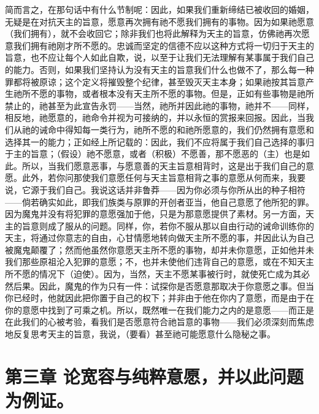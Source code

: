 简而言之，在那句话中有什么节制呢：因此，如果我们重新缔结已被收回的婚姻，无疑是在对抗天主的旨意，愿意再次拥有祂不愿我们拥有的事物。因为如果祂愿意（我们拥有），就不会收回它；除非我们也将此解释为天主的旨意，仿佛祂再次愿意我们拥有祂刚才所不愿的。忠诚而坚定的信德不应以这种方式将一切归于天主的旨意，也不应让每个人如此自欺，说，以至于让我们无法理解有某事属于我们自己的能力。否则，如果我们坚持认为没有天主的旨意我们什么也做不了，那么每一种罪都将被原谅；这个定义将摧毁整个纪律，甚至毁灭天主本身；如果祂按其旨意产生祂所不愿的事物，或者根本没有天主所不愿的事物。但是，正如有些事物是祂所禁止的，祂甚至为此宣告永罚——当然，祂所并因此祂的事物，祂并不——同样，相反地，祂愿意的，祂命令并视为可接纳的，并以永恒的赏报来回报。因此，当我们从祂的诫命中得知每一类行为，祂所不愿的和祂所愿意的，我们仍然拥有意愿和选择其一的能力；正如经上所记载的：因此，我们不应将属于我们自己选择的事归于主的旨意；（假设）祂不愿意，或者（积极）不愿善，那不愿恶的（主）也是如此。所以，当我们愿意恶事，与愿意善的天主旨意相背时，这是出于我们自己的意愿。此外，若你问那使我们意愿任何与天主旨意相背之事的意愿从何而来，我要说，它源于我们自己。我说这话并非鲁莽——因为你必须与你所从出的种子相符——倘若确实如此，即我们族类与原罪的开创者亚当，他自己意愿了他所犯的罪。因为魔鬼并没有将犯罪的意愿强加于他，只是为那意愿提供了素材。另一方面，天主的旨意则成了服从的问题。同样，你，若你不服从那以自由行动的诫命训练你的天主，将通过你意志的自由，心甘情愿地转向做天主所不愿的事，并因此认为自己被魔鬼颠覆了；然而他虽然你意愿天主所不愿的事物，却并未你意愿，正如他并未我们那些原祖沦入犯罪的意愿；不，也并未使他们违背自己的意愿，或在不知天主所不愿的情况下（迫使）。因为，当然，天主不愿某事被行时，就使死亡成为其必然后果。因此，魔鬼的作为只有一件：试探你是否愿意那取决于你意愿之事。但当你已经时，他就因此把你置于自己的权下；并非由于他在你内了意愿，而是由于在你的意愿中找到了可乘之机。所以，既然唯一在我们能力之内的是意愿——而正是在此我们的心被考验，看我们是否愿意符合祂旨意的事物——我们必须深刻而焦虑地反复思考天主的旨意，我说，（要看）甚至祂可能愿意什么隐秘之事。\par


\section{第三章 论宽容与纯粹意愿，并以此问题为例证。}

